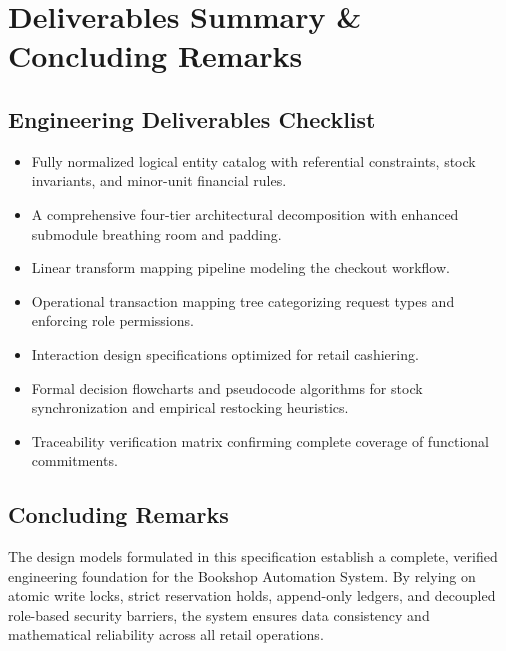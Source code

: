 \documentclass[12pt, a4paper]{report}
\begin{document}
\chapter{Deliverables Summary \& Concluding Remarks}
\section{Engineering Deliverables Checklist}
\begin{itemize}[leftmargin=1.5em]
  \item Fully normalized logical entity catalog with referential constraints, stock invariants, and minor-unit financial rules.
  \item A comprehensive four-tier architectural decomposition with enhanced submodule breathing room and padding.
  \item Linear transform mapping pipeline modeling the checkout workflow.
  \item Operational transaction mapping tree categorizing request types and enforcing role permissions.
  \item Interaction design specifications optimized for retail cashiering.
  \item Formal decision flowcharts and pseudocode algorithms for stock synchronization and empirical restocking heuristics.
  \item Traceability verification matrix confirming complete coverage of functional commitments.
\end{itemize}

\section{Concluding Remarks}
The design models formulated in this specification establish a complete, verified engineering foundation for the Bookshop Automation System. By relying on atomic write locks, strict reservation holds, append-only ledgers, and decoupled role-based security barriers, the system ensures data consistency and mathematical reliability across all retail operations.
\end{document}
